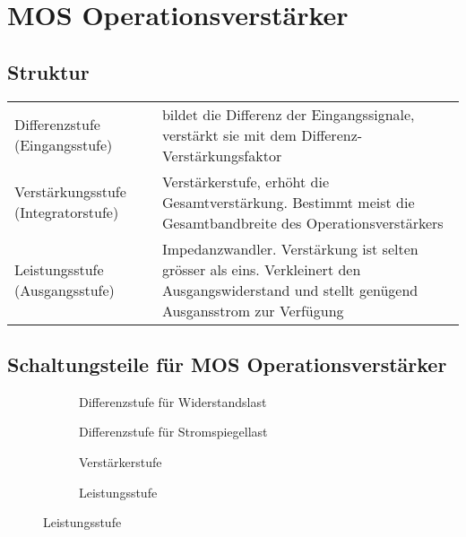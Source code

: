 \section{MOS Operationsverstärker}

\subsection{Struktur}
\begin{tabular}{p{3cm}p{15cm}}
	Differenzstufe (Eingangsstufe) & bildet die Differenz der Eingangssignale,
	verstärkt sie mit dem Differenz-Verstärkungsfaktor\\
	Verstärkungsstufe	(Integratorstufe) & Verstärkerstufe, erhöht die
	Gesamtverstärkung. Bestimmt meist die Gesamtbandbreite des
	Operationsverstärkers\\
	Leistungsstufe (Ausgangsstufe) & Impedanzwandler. Verstärkung ist selten
	grösser als eins. Verkleinert den Ausgangswiderstand und stellt genügend
	Ausgansstrom zur Verfügung\\
\end{tabular}

\subsection{Schaltungsteile für MOS Operationsverstärker}

\begin{figure}[H]
	\centering
	\begin{subfigure}[b]{4cm}
		\centering
		{}
		\caption{Differenzstufe für Widerstandslast}
	\end{subfigure}\qquad
	\begin{subfigure}[b]{4cm}
		\centering
		{}
		\caption{Differenzstufe für Stromspiegellast}
	\end{subfigure}
	\qquad
	\begin{subfigure}[b]{4cm}
		\centering
		{}
		\caption{Verstärkerstufe}
	\end{subfigure}
	\qquad
	\begin{subfigure}[b]{4cm}
		\centering
		{}
		\caption{Leistungsstufe}
	\end{subfigure}
	\label{fig:Schaltungsteile}
\end{figure}

